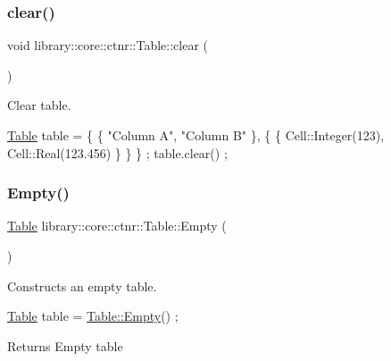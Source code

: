 \subsubsection{\texorpdfstring{clear()}{clear()}}
{\footnotesize\ttfamily void library\+::core\+::ctnr\+::\+Table\+::clear (\begin{DoxyParamCaption}{ }\end{DoxyParamCaption})}



Clear table. 


\begin{DoxyCode}
\hyperlink{classlibrary_1_1core_1_1ctnr_1_1_table_a5b11121caa4288c3da642af7c6a5a632}{Table} table = \{ \{ \textcolor{stringliteral}{"Column A"}, \textcolor{stringliteral}{"Column B"} \}, \{ \{ Cell::Integer(123), Cell::Real(123.456) \} \} \} ;
table.clear() ;
\end{DoxyCode}
 \mbox{\label{classlibrary_1_1core_1_1ctnr_1_1_table_ada8d9997351d5aea25ae8e563eedeb1c}} 
\subsubsection{\texorpdfstring{Empty()}{Empty()}}
{\footnotesize\ttfamily \hyperlink{classlibrary_1_1core_1_1ctnr_1_1_table}{Table} library\+::core\+::ctnr\+::\+Table\+::\+Empty (\begin{DoxyParamCaption}{ }\end{DoxyParamCaption})\hspace{0.3cm}{\ttfamily [static]}}



Constructs an empty table. 


\begin{DoxyCode}
\hyperlink{classlibrary_1_1core_1_1ctnr_1_1_table_a5b11121caa4288c3da642af7c6a5a632}{Table} table = \hyperlink{classlibrary_1_1core_1_1ctnr_1_1_table_ada8d9997351d5aea25ae8e563eedeb1c}{Table::Empty}() ;
\end{DoxyCode}


\begin{DoxyReturn}{Returns}
Empty table 
\end{DoxyReturn}
\mbox{\label{classlibrary_1_1core_1_1ctnr_1_1_table_af1aadfb47df33ffa4f611f571d52bd89}} 
